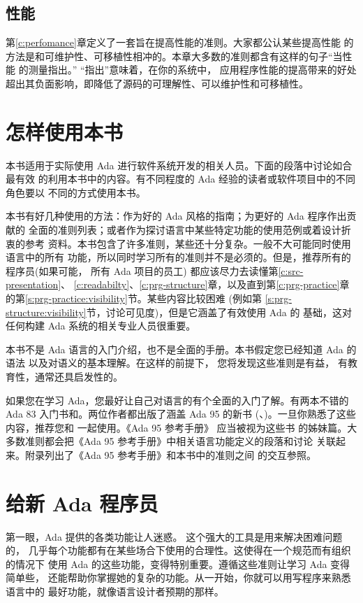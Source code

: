 \subsection{性能}
第\ref{c:perfomance}章定义了一套旨在提高性能的准则。大家都公认某些提高性能
的方法是和可维护性、可移植性相冲的。本章大多数的准则都含有这样的句子``当性能
的测量指出。'' ``指出''意味着，在你的系统中， 应用程序性能的提高带来的好处
超出其负面影响，即降低了源码的可理解性、可以维护性和可移植性。

\section{怎样使用本书}
本书适用于实际使用 Ada 进行软件系统开发的相关人员。下面的段落中讨论如合最有效
的利用本书中的内容。有不同程度的 Ada 经验的读者或软件项目中的不同角色要以
不同的方式使用本书。

本书有好几种使用的方法：作为好的 Ada 风格的指南；为更好的 Ada 程序作出贡献的
全面的准则列表；或者作为探讨语言中某些特定功能的使用范例或着设计折衷的参考
资料。本书包含了许多准则，某些还十分复杂。一般不大可能同时使用语言中的所有
功能，所以同时学习所有的准则并不是必须的。但是，推荐所有的程序员(如果可能，
所有 Ada 项目的员工) 都应该尽力去读懂第\ref{c:src-presentation}、
\ref{c:readabilty}、\ref{c:prg-structure}章，以及直到第\ref{c:prg-practice}章
的第\ref{s:prg-practice:visibility}节。某些内容比较困难 (例如第
\ref{s:prg-structure:visibility}节，讨论可见度)，但是它涵盖了有效使用 Ada 的
基础，这对任何构建 Ada 系统的相关专业人员很重要。

本书不是 Ada 语言的入门介绍，也不是全面的手册。本书假定您已经知道 Ada 的语法
以及对语义的基本理解。在这样的前提下， 您将发现这些准则是有益，
有教育性，通常还具启发性的。

如果您在学习 Ada，您最好让自己对语言的有个全面的入门了解。有两本不错的 Ada 83
入门书\cite{barnes89}和\cite{cohen86}。两位作者都出版了涵盖 Ada 95 的新书
(\cite{barnes96}、\cite{cohen96})。一旦你熟悉了这些内容，推荐您和
\cite{rational95}一起使用。《Ada 95 参考手册》\cite{arm95} 应当被视为这些书
的姊妹篇。大多数准则都会把《Ada 95 参考手册》中相关语言功能定义的段落和讨论
关联起来。附录\cite{a:cross-ref}列出了《Ada 95 参考手册》和本书中的准则之间
的交互参照。

\section{给新 Ada 程序员}
第一眼，Ada 提供的各类功能让人迷惑。 这个强大的工具是用来解决困难问题的，
几乎每个功能都有在某些场合下使用的合理性。这使得在一个规范而有组织的情况下
使用 Ada 的这些功能，变得特别重要。遵循这些准则让学习 Ada 变得简单些，
还能帮助你掌握她的复杂的功能。从一开始，你就可以用写程序来熟悉语言中的
最好功能，就像语言设计者预期的那样。

